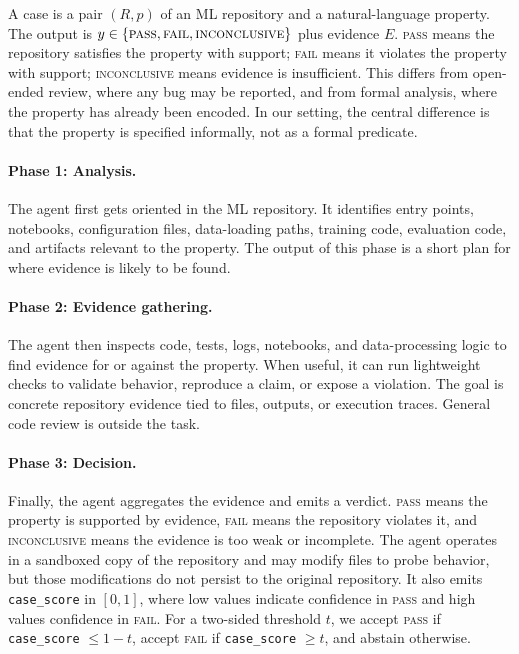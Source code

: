 \documentclass[11pt]{article}
\newcommand{\pass}{\textsc{pass}}
\newcommand{\fail}{\textsc{fail}}
\newcommand{\inconclusive}{\textsc{inconclusive}}
\begin{document}
A case is a pair $(R,p)$ of an ML repository and a natural-language property.
The output is $y \in \{\pass,\fail,\inconclusive\}$ plus evidence $E$.
\pass{} means the repository satisfies the property with support; \fail{} means
it violates the property with support; \inconclusive{} means evidence is
insufficient.
This differs from open-ended review, where any bug may be reported, and from
formal analysis, where the property has already been encoded.
In our setting, the central difference is that the property is specified
informally, not as a formal predicate.

\paragraph{Phase 1: Analysis.}
The agent first gets oriented in the ML repository.
It identifies entry points, notebooks, configuration files, data-loading paths,
training code, evaluation code, and artifacts relevant to the property.
The output of this phase is a short plan for where evidence is likely to be
found.

\paragraph{Phase 2: Evidence gathering.}
The agent then inspects code, tests, logs, notebooks, and data-processing logic
to find evidence for or against the property.
When useful, it can run lightweight checks to validate behavior, reproduce a
claim, or expose a violation.
The goal is concrete repository evidence tied to files, outputs, or execution
traces. General code review is outside the task.

\paragraph{Phase 3: Decision.}
Finally, the agent aggregates the evidence and emits a verdict.
\pass{} means the property is supported by evidence, \fail{} means the
repository violates it, and \inconclusive{} means the evidence is too weak or
incomplete.
The agent operates in a sandboxed copy of the repository and may modify files
to probe behavior, but those modifications do not persist to the original
repository.
It also emits \texttt{case\_score} in $[0,1]$, where low values indicate
confidence in \pass{} and high values confidence in \fail{}.
For a two-sided threshold $t$, we accept \pass{} if
\texttt{case\_score} $\leq 1-t$, accept \fail{} if
\texttt{case\_score} $\geq t$, and abstain otherwise.
\end{document}
